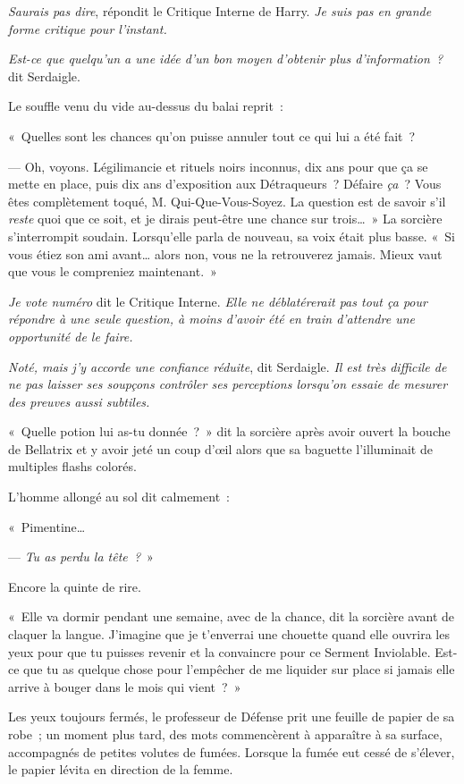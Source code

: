 \emph{Saurais pas dire}, répondit le Critique Interne de Harry. \emph{Je suis pas en grande forme critique pour l'instant.}

\emph{Est-ce que quelqu'un a une idée d'un bon moyen d'obtenir plus d'information~?} dit Serdaigle.

Le souffle venu du vide au-dessus du balai reprit~:

«~Quelles sont les chances qu'on puisse annuler tout ce qui lui a été fait~?

--- Oh, voyons. Légilimancie et rituels noirs inconnus, dix ans pour que ça se mette en place, puis dix ans d'exposition aux Détraqueurs~? Défaire \emph{ça}~? Vous êtes complètement toqué, M. Qui-Que-Vous-Soyez. La question est de savoir s'il \emph{reste} quoi que ce soit, et je dirais peut-être une chance sur trois…~» La sorcière s'interrompit soudain. Lorsqu'elle parla de nouveau, sa voix était plus basse. «~Si vous étiez son ami avant… alors non, vous ne la retrouverez jamais. Mieux vaut que vous le compreniez maintenant.~»

\emph{Je vote numéro} dit le Critique Interne. \emph{Elle ne déblatérerait pas tout ça pour répondre à une seule question, à moins d'avoir été en train d'attendre une opportunité de le faire.}

\emph{Noté, mais j'y accorde une confiance réduite}, dit Serdaigle. \emph{Il est très difficile de ne pas laisser ses soupçons contrôler ses perceptions lorsqu'on essaie de mesurer des preuves aussi subtiles.}

«~Quelle potion lui as-tu donnée~?~» dit la sorcière après avoir ouvert la bouche de Bellatrix et y avoir jeté un coup d'œil alors que sa baguette l'illuminait de multiples flashs colorés.

L'homme allongé au sol dit calmement~:

«~Pimentine…

--- \emph{Tu as perdu la tête~?}~»

Encore la quinte de rire.

«~Elle va dormir pendant une semaine, avec de la chance, dit la sorcière avant de claquer la langue. J'imagine que je t'enverrai une chouette quand elle ouvrira les yeux pour que tu puisses revenir et la convaincre pour ce Serment Inviolable. Est-ce que tu as quelque chose pour l'empêcher de me liquider sur place si jamais elle arrive à bouger dans le mois qui vient~?~»

Les yeux toujours fermés, le professeur de Défense prit une feuille de papier de sa robe~; un moment plus tard, des mots commencèrent à apparaître à sa surface, accompagnés de petites volutes de fumées. Lorsque la fumée eut cessé de s'élever, le papier lévita en direction de la femme.

